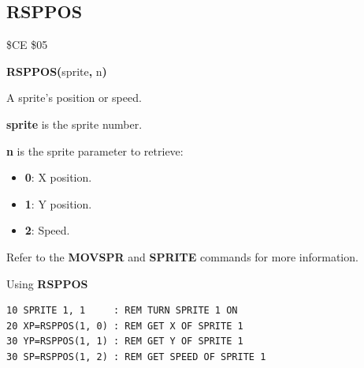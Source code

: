 \subsection{RSPPOS}
\begin{description}[leftmargin=2cm,style=nextline]
\item [Token:]    \$CE \$05

\item [Format:]   {\bf RSPPOS(}sprite{\bf,} n{\bf)}

\item [Returns:]  A sprite's position or speed.

                  {\bf sprite} is the sprite number.

                  {\bf n} is the sprite parameter to retrieve:

                  \begin{itemize}
                     \item {\bf 0}: X position.
                     \item {\bf 1}: Y position.
                     \item {\bf 2}: Speed.
                  \end{itemize}

\item [Remarks:]  Refer to the {\bf MOVSPR} and {\bf SPRITE} commands for more information.

\item [Example:]  Using {\bf RSPPOS}
\begin{tcolorbox}[colback=black,coltext=white]
\verbatimfont{\codefont}
\begin{verbatim}
10 SPRITE 1, 1     : REM TURN SPRITE 1 ON
20 XP=RSPPOS(1, 0) : REM GET X OF SPRITE 1
30 YP=RSPPOS(1, 1) : REM GET Y OF SPRITE 1
30 SP=RSPPOS(1, 2) : REM GET SPEED OF SPRITE 1
\end{verbatim}
\end{tcolorbox}
\end{description}


\newpage
